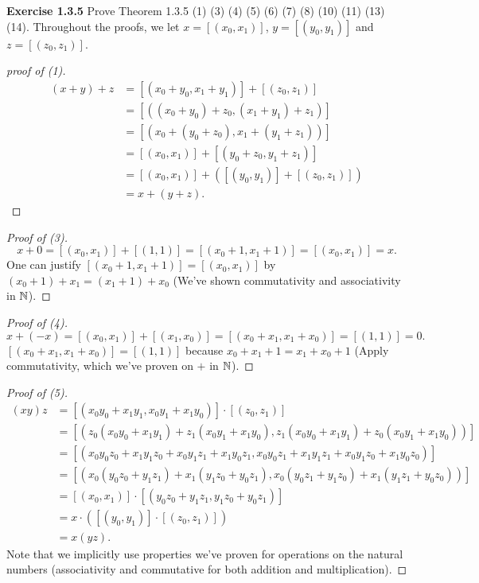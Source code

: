 \noindent \textbf{Exercise 1.3.5} Prove Theorem 1.3.5 (1) (3) (4) (5) (6) (7) (8) (10) (11) (13) (14).
Throughout the proofs, we let \(x = [(x_0, x_1)]\), \(y = [(y_0, y_1)]\) and \(z = [(z_0, z_1)]\).
\begin{proof}[proof of (1)]
    \begin{align*}
        (x+y)+z &= [(x_0 + y_0, x_1 + y_1)] + [(z_0, z_1)]\\
        &= [((x_0 + y_0) + z_0, (x_1 + y_1) + z_1)]\\
        &= [(x_0 + (y_0 + z_0), x_1 + (y_1 + z_1))]\\
        &= [(x_0, x_1)] + [(y_0 + z_0, y_1 + z_1)]\\
        &= [(x_0, x_1)] + ([(y_0, y_1)] + [(z_0, z_1)])\\
        &= x + (y+z).
    \end{align*}
\end{proof}
\begin{proof}[Proof of (3)]
    \[x + 0 = [(x_0, x_1)] + [(1,1)] = [(x_0 + 1, x_1 + 1)] = [(x_0, x_1)] = x.\]
    One can justify \([(x_0+1, x_1 + 1)] = [(x_0, x_1)]\) by \((x_0 + 1) + x_1 = (x_1 + 1) + x_0\) (We've shown commutativity and associativity in \(\mathbb{N}\)).
\end{proof}
\begin{proof}[Proof of (4)]
    \[x + (-x) = [(x_0, x_1)] + [(x_1, x_0)] = [(x_0+x_1, x_1+x_0)] = [(1,1)] = 0.\]
    \([(x_0+x_1, x_1+x_0)] = [(1,1)]\) because \(x_0 + x_1 + 1 = x_1 + x_0 + 1\) (Apply commutativity, which we've proven on \(+\) in \(\mathbb{N}\)).
\end{proof}
\begin{proof}[Proof of (5)]
    \begin{align*}
        (xy)z &= [(x_0y_0+x_1y_1, x_0y_1+x_1y_0)] \cdot [(z_0, z_1)] \\
        &= [(z_0(x_0y_0+x_1y_1) + z_1(x_0y_1 + x_1y_0), z_1(x_0y_0 + x_1y_1) + z_0(x_0y_1+x_1y_0))]\\
        &= [(x_0y_0z_0 + x_1y_1z_0 + x_0y_1z_1 + x_1y_0z_1, x_0y_0z_1 + x_1y_1z_1 + x_0y_1z_0 + x_1y_0z_0)]\\
        &= [(x_0(y_0z_0 + y_1z_1) + x_1(y_1z_0 + y_0z_1), x_0(y_0z_1 + y_1z_0) + x_1(y_1z_1 + y_0z_0))]\\
        &= [(x_0, x_1)] \cdot [(y_0z_0 + y_1z_1, y_1z_0 + y_0z_1)]\\
        &= x \cdot ([(y_0, y_1)] \cdot [(z_0, z_1)])\\
        &= x(yz).
    \end{align*}
    Note that we implicitly use properties we've proven for operations on the natural numbers (associativity and commutative for both addition and multiplication).
\end{proof}
